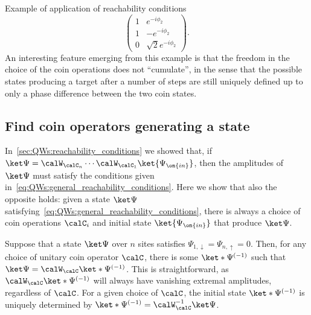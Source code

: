 \begin{examplebox}[label=ex:QWs:conditions_few_steps]{Example of application of reachability conditions}
\begin{equation}
\begin{pmatrix}
            1 & e^{-i\phi_2} \\
            1 & -e^{-i\phi_2} \\
            0 & \sqrt2 e^{-i\phi_2}
        \end{pmatrix}.
    \end{equation}
    An interesting feature emerging from this example is that the freedom in the choice of the coin operations does not ``cumulate'', in the sense that the possible states producing a target after a number of steps are still uniquely defined up to only a phase difference between the two coin states.
\end{examplebox}

\subsection{Find coin operators generating a state}
\label{sec:QWs:coin_operators_generating_state}

In~\cref{sec:QWs:reachability_conditions} we showed that, if $\ket\Psi=\calW_{\calC_n}\cdots\calW_{\calC_1}\ket{\Psi_{\on{in}}}$, then the amplitudes of $\ket\Psi$ must satisfy the conditions given in~\cref{eq:QWs:general_reachability_conditions}.
Here we show that also the opposite holds: given a state $\ket\Psi$ satisfying~\cref{eq:QWs:general_reachability_conditions}, there is always a choice of coin operations $\calC_i$ and initial state $\ket{\Psi_{\on{in}}}$ that produce $\ket\Psi$.

Suppose that a state $\ket\Psi$ over $n$ sites satisfies $\Psi_{1,\downarrow}=\Psi_{n,\uparrow}=0$. Then, for any choice of unitary coin operator $\calC$, there is some $\ket*{\Psi^{(-1)}}$ such that $\ket\Psi=\calW_\calC\ket*{\Psi^{(-1)}}$.
This is straightforward, as $\calW_\calC\ket*{\Psi^{(-1)}}$ will always have vanishing extremal amplitudes, regardless of $\calC$. For a given choice of $\calC$, the initial state $\ket*{\Psi^{(-1)}}$ is uniquely determined by $\ket*{\Psi^{(-1)}}=\calW_\calC^{-1}\ket\Psi$.

